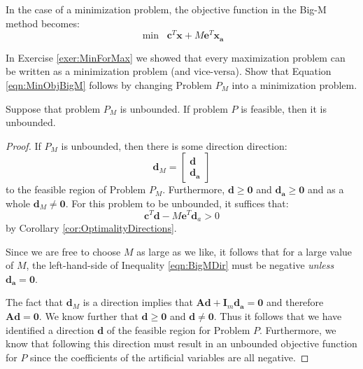 \begin{remark} In the case of a minimization problem, the objective function in the Big-M method becomes:
\begin{equation}
\min\;\;\mathbf{c}^T\mathbf{x} + M\mathbf{e}^T\mathbf{x_a}
\label{eqn:MinObjBigM}
\end{equation}
\end{remark}

\begin{exercise}
In Exercise \ref{exer:MinForMax} we showed that every maximization problem can be written as a minimization problem (and vice-versa). Show that Equation \ref{eqn:MinObjBigM} follows by changing Problem $P_M$ into a minimization problem.
\end{exercise}

\begin{lemma} Suppose that problem $P_M$ is unbounded. If problem $P$ is feasible, then it is unbounded.
\label{lem:UnboundedBigM}
\end{lemma}
\begin{proof} If $P_M$ is unbounded, then there is some direction direction:
\begin{displaymath}
\mathbf{d}_M = \begin{bmatrix}\mathbf{d}\\\mathbf{d_a}\end{bmatrix}
\end{displaymath} 
to the feasible region of Problem $P_M$. Furthermore, $\mathbf{d}\geq \mathbf{0}$ and $\mathbf{d_a} \geq \mathbf{0}$ and as a whole $\mathbf{d}_M \neq \mathbf{0}$. For this problem to be unbounded, it suffices that:
\begin{equation}
\mathbf{c}^T\mathbf{d} - M\mathbf{e}^T\mathbf{d}_a > 0
\label{eqn:BigMDir}
\end{equation}
by Corollary \ref{cor:OptimalityDirections}. 

Since we are free to choose $M$ as large as we like, it follows that for a large value of $M$, the left-hand-side of Inequality \ref{eqn:BigMDir} must be negative \textit{unless} 
$\mathbf{d_a} = \mathbf{0}$. 

The fact that $\mathbf{d}_M$ is a direction implies that $\mathbf{A}\mathbf{d} + \mathbf{I}_m\mathbf{d_a} = \mathbf{0}$ and therefore $\mathbf{A}\mathbf{d} = \mathbf{0}$. 
We know further that $\mathbf{d} \geq \mathbf{0}$ and $\mathbf{d} \neq \mathbf{0}$. Thus it follows that we have identified a direction $\mathbf{d}$ of the feasible region for Problem $P$. Furthermore, we know that following this direction must result in an unbounded objective function for $P$ since the coefficients of the artificial variables are all negative.
\end{proof}

